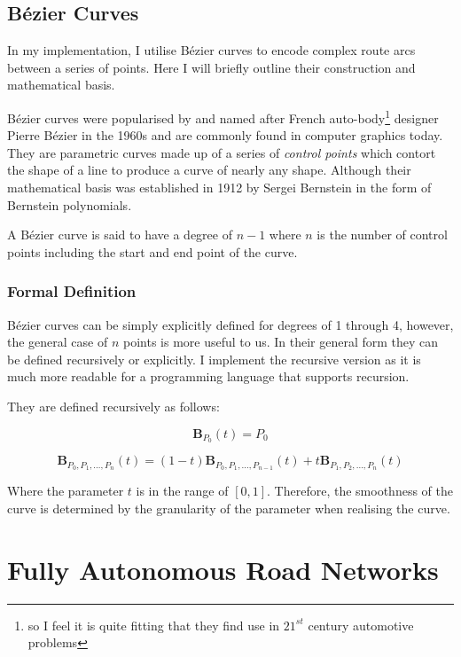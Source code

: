 \subsection{Bézier Curves}

In my implementation, I utilise Bézier curves to encode complex route arcs between a series of points. Here I will briefly outline their construction and mathematical basis.

Bézier curves were popularised by and named after French auto-body\footnote{so I feel it is quite fitting that they find use in $21^{st}$ century automotive problems} designer Pierre Bézier in the 1960s and are commonly found in computer graphics today. They are parametric curves made up of a series of \textit{control points} which contort the shape of a line to produce a curve of nearly any shape. Although their mathematical basis was established in 1912 by Sergei Bernstein in the form of Bernstein polynomials\cite{bernstein1912best}.

A Bézier curve is said to have a degree of $n-1$ where $n$ is the number of control points including the start and end point of the curve.

\subsubsection{Formal Definition} 

Bézier curves can be simply explicitly defined for degrees of 1 through 4, however, the general case of $n$ points is more useful to us. In their general form they can be defined recursively or explicitly. I implement the recursive version as it is much more readable for a programming language that supports recursion.

They are defined recursively as follows:

\begin{equation}
    \textbf{B}_{P_0}(t) = P_0
\end{equation}

\begin{equation}
    \textbf{B}_{P_0,P_1,\ldots,P_n}(t) = (1-t)\textbf{B}_{P_0,P_1,\ldots,P_{n-1}}(t) + t\textbf{B}_{P_1,P_2,\ldots,P_n}(t)
\end{equation}

Where the parameter $t$ is in the range of $[0,1]$. Therefore, the smoothness of the curve is determined by the granularity of the parameter when realising the curve.

\section{Fully Autonomous Road Networks}

